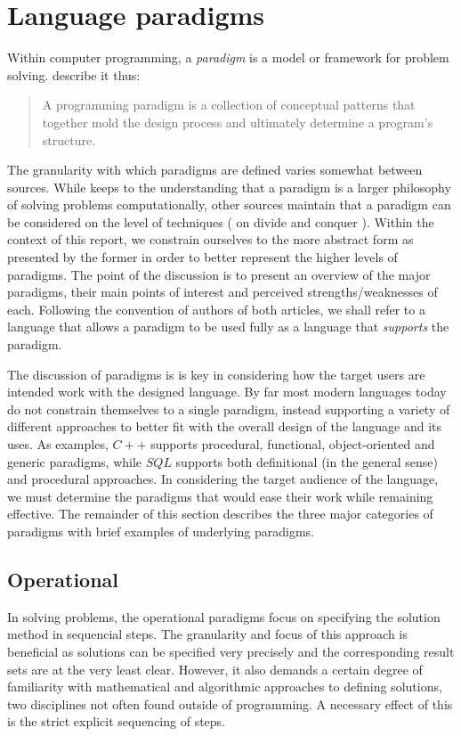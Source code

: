 \section{Language paradigms}
Within computer programming, a \emph{paradigm} is a model or framework for problem solving. \citeauthor{paradigms1992} describe it thus:

\begin{quote}
A programming paradigm is a collection of conceptual patterns that together mold the design process and ultimately determine a program's structure.
\end{quote}

The granularity with which paradigms are defined varies somewhat between sources. While \citeauthor{paradigms1992} keeps to the understanding that a paradigm is a larger philosophy of solving problems computationally, other sources maintain that a paradigm can be considered on the level of techniques (\citeauthor{paradigms1978} on divide and conquer \cite{paradigms1978}). Within the context of this report, we constrain ourselves to the more abstract form as presented by the former in order to better represent the higher levels of paradigms. The point of the discussion is to present an overview of the major paradigms, their main points of interest and perceived strengths/weaknesses of each. Following the convention of authors of both articles, we shall refer to a language that allows a paradigm to be used fully as a language that \emph{supports} the paradigm.

The discussion of paradigms is is key in considering how the target users are intended work with the designed language. By far most modern languages today do not constrain themselves to a single paradigm, instead supporting a variety of different approaches to better fit with the overall design of the language and its uses. As examples, $C++$ supports procedural, functional, object-oriented and generic paradigms, while $SQL$ supports both definitional (in the general sense) and procedural approaches. In considering the target audience of the language, we must determine the paradigms that would ease their work while remaining effective. The remainder of this section describes the three major categories of paradigms with brief examples of underlying paradigms.

\subsection{Operational}
In solving problems, the operational paradigms focus on specifying the solution method in sequencial steps. The granularity and focus of this approach is beneficial as solutions can be specified very precisely and the corresponding result sets are at the very least clear. However, it also demands a certain degree of familiarity with mathematical and algorithmic approaches to defining solutions, two disciplines not often found outside of programming. A necessary effect of this is the strict explicit sequencing of steps.

